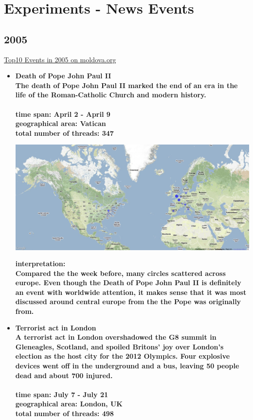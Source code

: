\documentclass[11pt,a4paper,english]{article}
\begin{document}
 \newpage

	\section{Experiments - News Events}
			\subsection{2005}
			\href{http://politicom.moldova.org/news/10-most-important-world-events-of-2005-7712-eng.html}{Top10 Events in 2005 on moldova.org}
				\begin{itemize}
				\item \bf Death of Pope John Paul II\rm
					\\ The death of Pope John Paul II marked the end of an era in the life of the Roman-Catholic Church and modern history. 
					\\\\ \bf time span: \rm April 2 - April 9
					\\ \bf geographical area: \rm Vatican
					\\ \bf total number of threads: \rm 347
					
					\includegraphics[width=130mm]{img/post-pope}
						
					\bf interpretation: \rm
					\\ Compared the the week before, many circles scattered across europe. Even though the Death of Pope John Paul II is definitely an event with worldwide attention, it makes sense that it was most discussed around central europe from the the Pope was originally from.
						


				\item \bf Terrorist act in London \rm
					\\ A terrorist act in London overshadowed the G8 summit in Gleneagles, Scotland, and spoiled Britons' joy over London's election as the host city for the 2012 Olympics. Four explosive devices went off in the underground and a bus, leaving 50 people dead and about 700 injured.
					\\\\ \bf time span: \rm July 7 - July 21
					\\ \bf geographical area: \rm London, UK
					\\ \bf total number of threads: \rm 498
					

\end{itemize}
\end{document}
